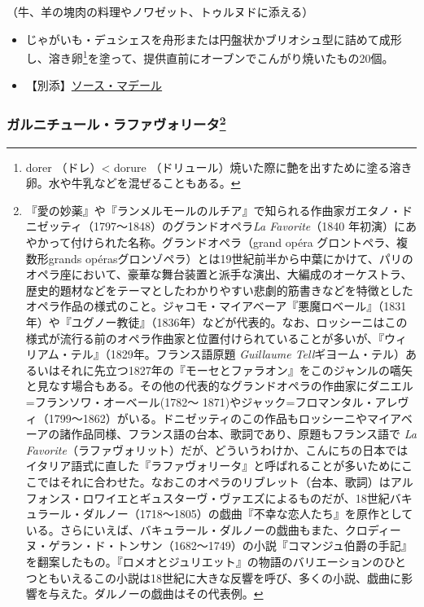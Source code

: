 \begin{recette}
（牛、羊の塊肉の料理やノワゼット、トゥルヌドに添える）

\begin{itemize}
\item
  じゃがいも・デュシェスを舟形または円盤状かブリオシュ型に詰めて成形し、溶き卵\footnote{dorer
    （ドレ）\textless{} dorure
    （ドリュール）焼いた際に艶を出すために塗る溶き卵。水や牛乳などを混ぜることもある。}を塗って、提供直前にオーブンでこんがり焼いたもの20個。
\item
  【別添】\protect\hyperlink{sauce-madere}{ソース・マデール}
\end{itemize}

\atoaki{}

\hypertarget{garniture-a-la-favorite}{%
\subsubsection[ガルニチュール・ラファヴォリータ]{\texorpdfstring{ガルニチュール・ラファヴォリータ\footnote{『愛の妙薬』や『ランメルモールのルチア』で知られる作曲家ガエタノ・ドニゼッティ（1797〜1848）のグランドオペラ\emph{La
  Favorite}（1840
  年初演）にあやかって付けられた名称。グランドオペラ（grand opéra
  グロントペラ、複数形grands
  opérasグロンゾペラ）とは19世紀前半から中葉にかけて、パリのオペラ座において、豪華な舞台装置と派手な演出、大編成のオーケストラ、歴史的題材などをテーマとしたわかりやすい悲劇的筋書きなどを特徴としたオペラ作品の様式のこと。ジャコモ・マイアベーア『悪魔ロベール』（1831年）や『ユグノー教徒』（1836年）などが代表的。なお、ロッシーニはこの様式が流行る前のオペラ作曲家と位置付けられていることが多いが、『ウィリアム・テル』（1829年。フランス語原題
  \emph{Guillaume
  Tell}ギヨーム・テル）あるいはそれに先立つ1827年の『モーセとファラオン』をこのジャンルの嚆矢と見なす場合もある。その他の代表的なグランドオペラの作曲家にダニエル=フランソワ・オーベール(1782〜
  1871)やジャック=フロマンタル・アレヴィ（1799〜1862）がいる。ドニゼッティのこの作品もロッシーニやマイアベーアの諸作品同様、フランス語の台本、歌詞であり、原題もフランス語で
  \emph{La
  Favorite}（ラファヴォリット）だが、どういうわけか、こんにちの日本ではイタリア語式に直した『ラファヴォリータ』と呼ばれることが多いためにここではそれに合わせた。なおこのオペラのリブレット（台本、歌詞）はアルフォンス・ロワイエとギュスターヴ・ヴァエズによるものだが、18世紀バキュラール・ダルノー（1718〜1805）の戯曲『不幸な恋人たち』を原作としている。さらにいえば、バキュラール・ダルノーの戯曲もまた、クロディーヌ・ゲラン・ド・トンサン（1682〜1749）の小説『コマンジュ伯爵の手記』を翻案したもの。『ロメオとジュリエット』の物語のバリエーションのひとつともいえるこの小説は18世紀に大きな反響を呼び、多くの小説、戯曲に影響を与えた。ダルノーの戯曲はその代表例。}}{ガルニチュール・ラファヴォリータ}}\label{garniture-a-la-favorite}}


\end{recette}
